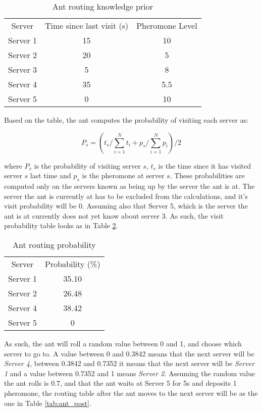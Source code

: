 \begin{table}
\centering
\begin{tabular}{c|c|c}
Server & Time since last visit (s) & Pheromone Level \\
Server 1 & 15 & 10 \\ 
Server 2 & 20 & 5 \\
Server 3 & 5 & 8 \\
Server 4 & 35 & 5.5 \\
Server 5 & 0 & 10 \\
\end{tabular}
\caption{Ant routing knowledge prior}
\label{tab:ant_prio}
\end{table}

Based on the table, the ant computes the probability of visiting each server as:

\begin{equation}
P_s = (t_s / \sum_{i=1}^{N} t_i + p_{s} / \sum_{i=1}^{N} p_i) / 2
\end{equation}

where $P_s$ is the probability of visiting server $s$, $t_s$ is the time since it has visited server $s$ last time and $p_{s}$ is the pheromone at server $s$. These probabilities are computed only on the servers known as being up by the server the ant is at. The server the ant is currently at has to be excluded from the calculations, and it's visit probability will be 0. Assuming also that Server 5, which is the server the ant is at currently does not yet know about server 3. As such, the visit probability table looks as in Table \ref{tab:ant_prob}.

\begin{table}
\centering
\begin{tabular}{c|c}
Server & Probability (\%) \\
Server 1 & 35.10 \\
Server 2 & 26.48 \\
Server 4 & 38.42 \\
Server 5 & 0 \\
\end{tabular}
\caption{Ant routing probability}
\label{tab:ant_prob}
\end{table}

As such, the ant will roll a random value between 0 and 1, and choose which server to go to. A value between 0 and 0.3842 means that the next server will be \textit{Server 4}, between 0.3842 and 0.7352 it means that the next server will be \textit{Server 1} and a value between 0.7352 and 1 means \textit{Server 2}. Assuming the random value the ant rolls is 0.7, and that the ant waits at Server 5 for 5s and deposits 1 pheromone, the routing table after the ant moves to the next server will be as the one in Table \ref{tab:ant_post}.

